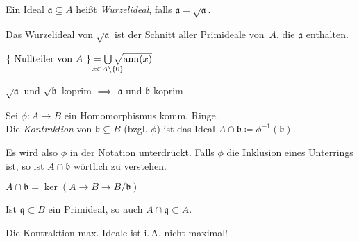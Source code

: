 \documentclass{cheat-sheet}
\DeclareMathOperator{\ann}{ann} %
\newcommand{\aaa}{\mathfrak{a}}
\newcommand{\bbb}{\mathfrak{b}}
\newcommand{\qqq}{\mathfrak{q}}
\newcommand{\mmm}{\mathfrak{m}}
\begin{document}
\begin{defn}
  Ein Ideal $\aaa \subseteq A$ heißt \emph{Wurzelideal}, falls $\aaa = \sqrt{\aaa}$.
\end{defn}

\begin{prop}
  Das Wurzelideal von $\sqrt{\aaa}$ ist der Schnitt aller Primideale von~$A$, die $\aaa$ enthalten.
\end{prop}

\begin{prop}
  $\{ \text{ Nullteiler von $A$ } \} = \bigcup_{\mathclap{x \in A \setminus \{ 0 \}}} \sqrt{\ann(x)}$
\end{prop}

\begin{lem}
  $\sqrt{\aaa}$ und $\sqrt{\bbb}$ koprim $\implies$ $\aaa$ und $\bbb$ koprim
\end{lem}



\begin{defn}
  Sei $\phi : A \to B$ ein Homomorphismus komm. Ringe. \\
  Die \emph{Kontraktion} von $\bbb \subseteq B$ (bzgl. $\phi$) ist das Ideal $A \cap \bbb \coloneqq \phi^{-1}(\bbb)$.
\end{defn}

\begin{bem}
  Es wird also $\phi$ in der Notation unterdrückt.
  Falls $\phi$ die Inklusion eines Unterrings ist, so ist $A \cap \bbb$ wörtlich zu verstehen.
\end{bem}

\begin{beob}
  $A \cap \bbb = \ker(A \to B \to B/\bbb)$
\end{beob}

\begin{lem}
  Ist $\qqq \subset B$ ein Primideal, so auch $A \cap \qqq \subset A$.
\end{lem}

\begin{acht}
  Die Kontraktion max. Ideale ist i.\,A. nicht maximal!
\end{acht}

\end{document}

